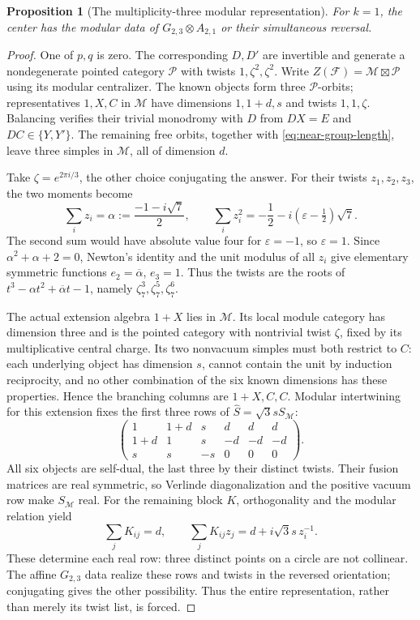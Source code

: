 \documentclass[11pt,a4paper]{article}
\newtheorem{proposition}[theorem]{Proposition}
\theoremstyle{definition}
\begin{document}
\begin{proposition}[The multiplicity-three modular representation]
\label{prop:m3-modular}
For $k=1$, the center has the modular data of
$G_{2,3}\otimes A_{2,1}$ or their simultaneous reversal.
\end{proposition}
\begin{proof}
One of $p,q$ is zero. The corresponding $D,D'$ are invertible and
generate a nondegenerate pointed category $\mathcal P$ with twists
$1,\zeta^2,\zeta^2$. Write
$Z(\mathcal F)=\mathcal M\boxtimes\mathcal P$ using its modular
centralizer. The known objects form three $\mathcal P$-orbits;
representatives $1,X,C$ in $\mathcal M$ have dimensions
$1,1+d,s$ and twists $1,1,\zeta$. Balancing verifies their trivial
monodromy with $D$ from $D X=E$ and $DC\in\{Y,Y'\}$.
The remaining free orbits, together with
\eqref{eq:near-group-length}, leave three simples in $\mathcal M$,
all of dimension $d$.

Take $\zeta=e^{2\pi i/3}$, the other choice conjugating the answer.
For their twists $z_1,z_2,z_3$, the two moments become
\[
 \sum_i z_i=\alpha:=\frac{-1-i\sqrt7}{2},\qquad
 \sum_i z_i^2=-\frac12-i(\varepsilon-\tfrac12)\sqrt7.
\]
The second sum would have absolute value four for $\varepsilon=-1$,
so $\varepsilon=1$. Since $\alpha^2+\alpha+2=0$, Newton's identity
and the unit modulus of all $z_i$ give elementary symmetric functions
$e_2=\overline\alpha$, $e_3=1$. Thus the twists are the roots of
$t^3-\alpha t^2+\overline\alpha t-1$, namely
$\zeta_7^3,\zeta_7^5,\zeta_7^6$.

The actual extension algebra $1+X$ lies in $\mathcal M$. Its local
module category has dimension three and is the pointed category with
nontrivial twist $\zeta$, fixed by its multiplicative central charge.
Its two nonvacuum simples must both restrict to $C$: each underlying
object has dimension $s$, cannot contain the unit by induction
reciprocity, and no other combination of the six known dimensions
has these properties. Hence the branching columns are $1+X,C,C$.
Modular intertwining for this extension
\cite[Theorems~4.1 and~4.5]{KO} fixes the first three rows
of $\widehat S=\sqrt3sS_{\mathcal M}$:
\[
 \begin{pmatrix}
 1&1+d&s&d&d&d\\
 1+d&1&s&-d&-d&-d\\
 s&s&-s&0&0&0
 \end{pmatrix}.
\]
All six objects are self-dual, the last three by their distinct
twists. Their fusion matrices are real symmetric, so Verlinde
diagonalization and the positive vacuum row make $S_{\mathcal M}$
real. For the remaining block $K$, orthogonality and the modular
relation yield
\[
 \sum_jK_{ij}=d,\qquad
 \sum_jK_{ij}z_j=d+i\sqrt3s\,z_i^{-1}.
\]
These determine each real row: three distinct points on a circle are
not collinear. The affine $G_{2,3}$ data
\cite[Table~4 and equation~(3.8)]{AGJS} realize these rows and twists
in the reversed orientation; conjugating gives the other possibility.
Thus the entire representation, rather than merely its twist list,
is forced.
\end{proof}
\end{document}
